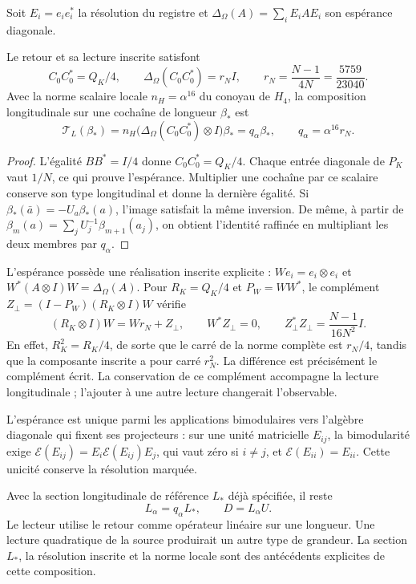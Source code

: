 Soit $E_i=e_ie_i^*$ la résolution du registre et
$\Delta_\Omega(A)=\sum_iE_iAE_i$ son espérance diagonale.

\begin{lemma}
\label{md:rigidez:retorno}
Le retour et sa lecture inscrite satisfont
\[
 C_0C_0^*=Q_K/4,\qquad
 \Delta_\Omega(C_0C_0^*)=r_NI,\qquad
 r_N=\frac{N-1}{4N}=\frac{5759}{23040}.
\]
Avec la norme scalaire locale $n_H=\alpha^{16}$ du conoyau de $H_4$,
la composition longitudinale sur une cochaîne de longueur $\beta_*$ est
\[
 \mathscr T_L(\beta_*)=
 n_H\bigl(\Delta_\Omega(C_0C_0^*)\otimes I\bigr)\beta_*
 =q_\alpha\beta_*,
 \qquad q_\alpha=\alpha^{16}r_N.
 \label{md:rigidez:qalpha}
\]
\end{lemma}
\begin{proof}
L’égalité $BB^*=I/4$ donne $C_0C_0^*=Q_K/4$. Chaque entrée diagonale
de $P_K$ vaut $1/N$, ce qui prouve l’espérance. Multiplier une
cochaîne par ce scalaire conserve son type longitudinal et donne la dernière
égalité. Si $\beta_*(\bar a)=-U_a\beta_*(a)$, l’image satisfait la
même inversion. De même, à partir de
$\beta_m(a)=\sum_jU_j^{-1}\beta_{m+1}(a_j)$, on obtient l’identité
raffinée en multipliant les deux membres par $q_\alpha$.
\end{proof}

L’espérance possède une réalisation inscrite explicite :
$We_i=e_i\otimes e_i$ et
$W^*(A\otimes I)W=\Delta_\Omega(A)$. Pour
$R_K=Q_K/4$ et $P_W=WW^*$, le complément
$Z_\perp=(I-P_W)(R_K\otimes I)W$ vérifie
\[
 (R_K\otimes I)W=Wr_N+Z_\perp,\qquad W^*Z_\perp=0,\qquad
 Z_\perp^*Z_\perp=\frac{N-1}{16N^2}I.
\]
En effet, $R_K^2=R_K/4$, de sorte que le carré de la norme complète
est $r_N/4$, tandis que la composante inscrite a pour carré $r_N^2$.
La différence est précisément le complément écrit. La conservation de
ce complément accompagne la lecture longitudinale ; l’ajouter à une autre lecture
changerait l’observable.

L’espérance est unique parmi les applications bimodulaires vers
l’algèbre diagonale qui fixent ses projecteurs : sur une unité matricielle
$E_{ij}$, la bimodularité exige
$\mathcal E(E_{ij})=E_i\mathcal E(E_{ij})E_j$, qui vaut zéro si $i\ne j$,
et $\mathcal E(E_{ii})=E_{ii}$. Cette unicité conserve la résolution marquée.

Avec la section longitudinale de référence $L_*$ déjà spécifiée, il reste
\begin{equation}
 L_\alpha=q_\alpha L_*,\qquad D=L_\alpha U.
 \label{md:rigidez:longitud-def}
\end{equation}
Le lecteur utilise le retour comme opérateur linéaire sur une longueur. Une
lecture quadratique de la source produirait un autre type de grandeur. La
section $L_*$, la résolution inscrite et la norme locale sont des antécédents
explicites de cette composition.

